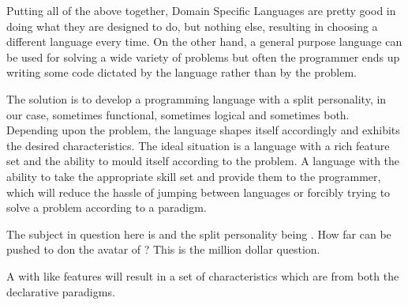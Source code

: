 \documentclass[thesis-solanki.tex]{subfiles}
\begin{document}
Putting all of the above together, Domain Specific Languages
are pretty good in doing what they are designed to do,
but nothing else, resulting in choosing a different language every time.
On the other hand, a general purpose language can be used for solving a wide variety of problems but often the programmer ends up writing 
some code dictated by the language rather than by the
problem.

The solution is to develop a programming language with a split personality, in our case, sometimes functional, sometimes logical and sometimes both.
Depending upon the problem, the language shapes itself accordingly and exhibits the desired characteristics. The ideal situation is a
language with a rich
feature set and the ability to mould itself according to the problem. A language with the ability to take the appropriate skill set and provide them to the programmer, which will reduce the hassle of jumping between languages or forcibly trying to solve a problem according to a paradigm.

The subject in question here is  and the split personality being . How far can  be pushed to
don the avatar of ?
This is the million dollar question.

A  with  like features will result in a set of characteristics which are from both the declarative paradigms.
\end{document}
